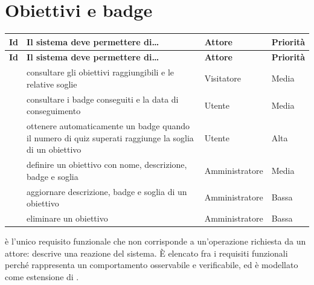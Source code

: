\section{Obiettivi e badge}

\begin{longtable}{@{}l L{7.3cm} L{2.6cm} L{1.8cm}@{}}
\toprule
\textbf{Id} & \textbf{Il sistema deve permettere di\dots} & \textbf{Attore} &
\textbf{Priorità} \\
\midrule
\endfirsthead
\toprule
\textbf{Id} & \textbf{Il sistema deve permettere di\dots} & \textbf{Attore} &
\textbf{Priorità} \\
\midrule
\endhead
\bottomrule
\endlastfoot

 & consultare gli obiettivi raggiungibili e le relative soglie &
  Visitatore & Media \\
 & consultare i badge conseguiti e la data di conseguimento &
  Utente & Media \\
 & ottenere automaticamente un badge quando il numero di quiz
  superati raggiunge la soglia di un obiettivo & Utente & Alta \\
 & definire un obiettivo con nome, descrizione, badge e soglia &
  Amministratore & Media \\
 & aggiornare descrizione, badge e soglia di un obiettivo &
  Amministratore & Bassa \\
 & eliminare un obiettivo & Amministratore & Bassa \\

\end{longtable}

\begin{nota}
 è l'unico requisito funzionale che non corrisponde a
un'operazione richiesta da un attore: descrive una reazione del sistema. È
elencato fra i requisiti funzionali perché rappresenta un comportamento
osservabile e verificabile, ed è modellato come estensione di .
\end{nota}
